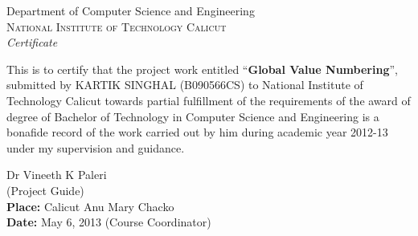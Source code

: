 \newpage
\thispagestyle{empty}

\begin{center}

\huge{Department of Computer Science and Engineering}\\[0.5cm]
\normalsize
\textsc{National Institute of Technology Calicut}\\[2.0cm]

\emph{\LARGE Certificate}\\[2.5cm]
\end{center}
\normalsize This is to certify that the project work entitled ``\textbf {Global Value Numbering}'', submitted by KARTIK SINGHAL (B090566CS) to National Institute of Technology Calicut towards partial fulfillment of the requirements of the award of degree of Bachelor of Technology in Computer Science and Engineering is a bonafide record of the work carried out by him during academic year 2012-13 under my supervision and guidance.\\[3.0cm]


\begin{flushright}
Dr Vineeth K Paleri\\
(Project Guide)\\[3.0cm]
\textbf {Place:} Calicut \hfill Anu Mary Chacko\\
\textbf {Date:} May 6, 2013 \hfill (Course Coordinator)
\end{flushright}
